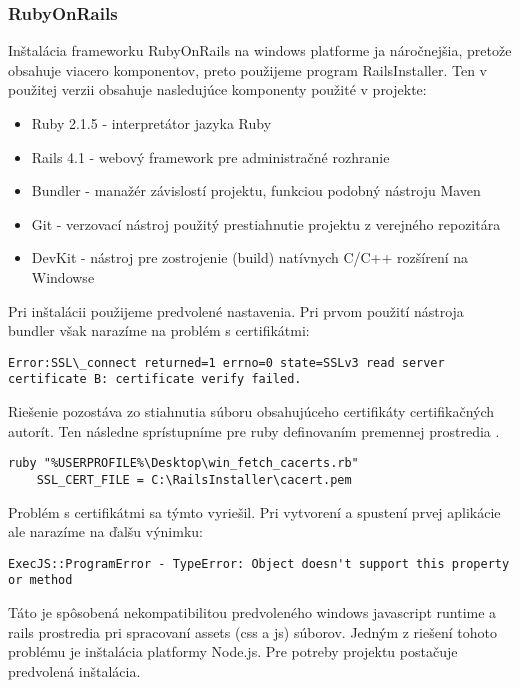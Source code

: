 \subsubsection{RubyOnRails}	%
	Inštalácia frameworku RubyOnRails na windows platforme ja náročnejšia, pretože obsahuje viacero komponentov, preto použijeme program RailsInstaller. Ten v použitej verzii obsahuje nasledujúce komponenty použité v projekte:
	\begin{itemize}
		\item Ruby 2.1.5 - interpretátor jazyka Ruby
		\item Rails 4.1 - webový framework pre administračné rozhranie
		\item Bundler - manažér závislostí projektu, funkciou podobný nástroju Maven
		\item Git - verzovací nástroj použitý prestiahnutie projektu z verejného repozitára
		\item DevKit - nástroj pre zostrojenie (build) natívnych C/C++ rozšírení na Windowse
	\end{itemize}

	Pri inštalácii použijeme predvolené nastavenia. Pri prvom použití nástroja bundler však narazíme na problém s certifikátmi:
	\begin{lstlisting}[label=lst:errorssl,caption=Problém s certifikátom v Ruby On Rails]
	Error:SSL\_connect returned=1 errno=0 state=SSLv3 read server certificate B: certificate verify failed.
	\end{lstlisting}
	Riešenie pozostáva zo stiahnutia súboru obsahujúceho certifikáty certifikačných autorít. Ten následne sprístupníme pre ruby definovaním premennej prostredia \cite{web:certificate-fix}.
	\begin{lstlisting}[label=lst:sslfix,caption=Riešenie problému s certifikátmi]
	ruby "%USERPROFILE%\Desktop\win_fetch_cacerts.rb"
	SSL_CERT_FILE = C:\RailsInstaller\cacert.pem
	\end{lstlisting}
		
	Problém s certifikátmi sa týmto vyriešil. Pri vytvorení a spustení prvej aplikácie ale narazíme na ďalšu výnimku:
	\begin{lstlisting}[label=lst:errorjs,caption=Problém s javascript runtime]
	ExecJS::ProgramError - TypeError: Object doesn't support this property or method
	\end{lstlisting}
	Táto je spôsobená nekompatibilitou predvoleného windows javascript runtime a rails prostredia pri spracovaní assets (css a js) súborov. Jedným z riešení tohoto problému je inštalácia platformy Node.js. Pre potreby projektu postačuje predvolená inštalácia.
	

